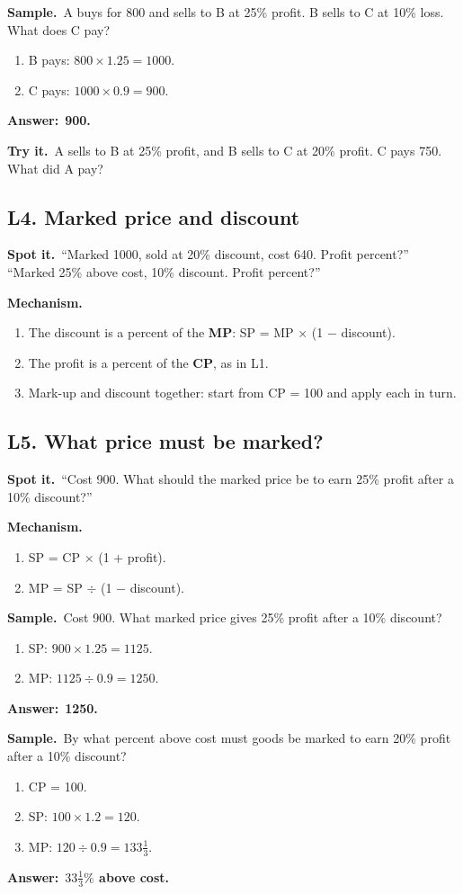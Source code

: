 \documentclass[11pt,a4paper]{article}
\let\oldsubsection\subsection
\renewcommand{\subsection}{\needspace{9\baselineskip}\oldsubsection}
\newcommand{\spot}{\textbf{\color{ember}Spot it.}\ }
\newcommand{\mech}{\textbf{\color{ember}Mechanism.}\ }
\newif\ifkeepsamp
\newcommand{\ans}[1]{\par\nopagebreak\noindent\textbf{\color{ember}Answer:}\ \textbf{#1}\par}
\newcommand{\samp}{\ifkeepsamp\needspace{4\baselineskip}\fi\textbf{\color{ember}Sample.}\ }
\newcommand{\tryit}[1]{\textbf{\color{ember}Try it.}\ #1}
\begin{document}
\samp A buys for 800 and sells to B at 25\% profit. B sells to C at 10\% loss. What does C pay?
\begin{enumerate}
\item B pays: $800 \times 1.25 = 1000$.
\item C pays: $1000 \times 0.9 = 900$.
\end{enumerate}
\ans{900.}

\tryit A sells to B at 25\% profit, and B sells to C at 20\% profit. C pays 750. What did A pay?

\subsection{L4. Marked price and discount}
\spot ``Marked 1000, sold at 20\% discount, cost 640. Profit percent?'' ``Marked 25\% above cost, 10\% discount. Profit percent?''

\mech
\begin{enumerate}
\item The discount is a percent of the \textbf{MP}: SP = MP $\times$ (1 $-$ discount).
\item The profit is a percent of the \textbf{CP}, as in L1.
\item Mark-up and discount together: start from CP = 100 and apply each in turn.
\end{enumerate}

\subsection{L5. What price must be marked?}
\spot ``Cost 900. What should the marked price be to earn 25\% profit after a 10\% discount?''

\mech
\begin{enumerate}
\item SP = CP $\times$ (1 + profit).
\item MP = SP $\div$ (1 $-$ discount).
\end{enumerate}

\samp Cost 900. What marked price gives 25\% profit after a 10\% discount?
\begin{enumerate}
\item SP: $900 \times 1.25 = 1125$.
\item MP: $1125 \div 0.9 = 1250$.
\end{enumerate}
\ans{1250.}

\samp By what percent above cost must goods be marked to earn 20\% profit after a 10\% discount?
\begin{enumerate}
\item CP = 100.
\item SP: $100 \times 1.2 = 120$.
\item MP: $120 \div 0.9 = 133\tfrac13$.
\end{enumerate}
\ans{$33\tfrac13\%$ above cost.}
\end{document}
